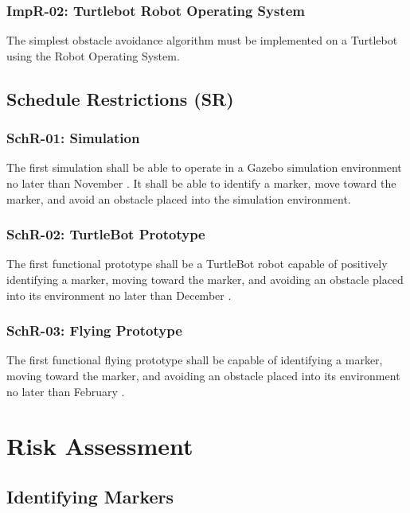 \documentclass{article}
\begin{document}
		\subsubsection{ImpR-02: Turtlebot Robot Operating System}
		
		The simplest obstacle avoidance algorithm must be implemented on a Turtlebot using the Robot Operating System.
		
	\subsection{Schedule Restrictions (SR)}
	
		\subsubsection{SchR-01: Simulation}
		
		The first simulation shall be able to operate in a Gazebo simulation environment no later than November . It shall be able to identify a marker, move toward the marker, and avoid an obstacle placed into the simulation environment.
		
		\subsubsection{SchR-02: TurtleBot Prototype}
		
		The first functional prototype shall be a TurtleBot robot capable of positively identifying a marker, moving toward the marker, and avoiding an obstacle placed into its environment no later than December .
		
		\subsubsection{SchR-03: Flying Prototype}
		
		The first functional flying prototype shall be capable of identifying a marker, moving toward the marker, and avoiding an obstacle placed into its environment no later than February  .

\section{Risk Assessment}

	\subsection{Identifying Markers}
	
\end{document}
